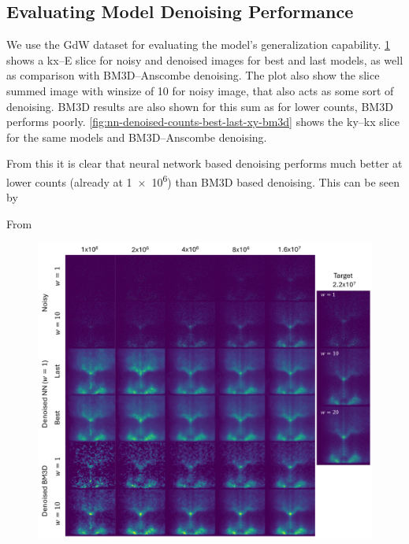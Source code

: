 \subsection{Evaluating Model Denoising Performance}
We use the \gls{GdW} dataset for evaluating the model's generalization capability. \cref{fig:nn-denoised-counts-best-last-ex-bm3d} shows a \gls{kx}--\gls{E} slice for noisy and denoised images for best and last models, as well as comparison with \gls{BM3D}--Anscombe denoising. The plot also show the slice summed image with \gls{winsize} of \num{10} for noisy image, that also acts as some sort of denoising. BM3D results are also shown for this sum as for lower counts, BM3D performs poorly. \cref{fig:nn-denoised-counts-best-last-xy-bm3d} shows the \gls{ky}--\gls{kx} slice for the same models and \gls{BM3D}--Anscombe denoising.

From this it is clear that neural network based denoising performs much better at lower counts (already at \num{1e6}) than BM3D based denoising. This can be seen by 

From 


\begin{figure}[h]
    \centering
    \includegraphics[width=1\linewidth]{images/nn_denoised_counts_best_last_ex_bm3d.pdf}
    \caption{}
    \label{fig:nn-denoised-counts-best-last-ex-bm3d}
\end{figure}







